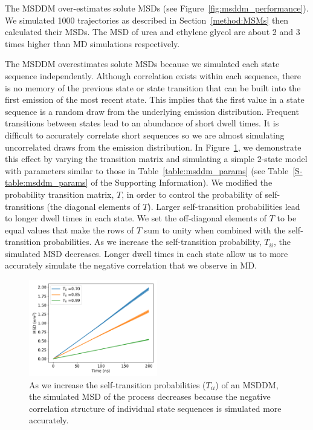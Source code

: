 \documentclass{article}
\begin{document}
  The MSDDM over-estimates solute MSDs (see Figure~\ref{fig:msddm_performance}). 
  We simulated 1000 trajectories as described in Section~\ref{method:MSMs} then
  calculated their MSDs. The MSD of urea and ethylene glycol are about 2 and 3 times
  higher than MD simulations respectively.
 
    The MSDDM overestimates solute MSDs because we simulated each state
  sequence independently. Although correlation exists within each
  sequence, there is no memory of the previous state or state transition 
  that can be built into the first emission of the most recent state. 
  This implies that the first value in a state sequence is a random
  draw from the underlying emission distribution. Frequent transitions
  between states lead to an abundance of short dwell times. It is 
  difficult to accurately correlate short sequences so we are 
  almost simulating uncorrelated draws from the emission distribution.
  In Figure~\ref{fig:T_sensitivity}, we demonstrate this effect by varying 
  the transition matrix and simulating a simple 2-state model with parameters
  similar to those in Table~\ref{table:msddm_params} (see Table~\ref{S-table:msddm_params}
  of the Supporting Information). We modified the probability
  transition matrix, $T$, in order to control the probability of 
  self-transitions (the diagonal elements of $T$). Larger self-transition probabilities lead to longer dwell 
  times in each state. We set the off-diagonal elements of $T$ to be equal values that make the
  rows of $T$ sum to unity when combined with the self-transition probabilities. 
  As we increase the self-transition probability, $T_{ii}$, the simulated MSD 
  decreases. Longer dwell times in each state allow us to more accurately
  simulate the negative correlation that we observe in MD.
  
  \begin{figure}
  \centering
  \includegraphics[width=0.5\textwidth]{T_sensitivity.pdf}
  \caption{As we increase the self-transition probabilities ($T_{ii}$) of an MSDDM,
  the simulated MSD of the process decreases because the negative correlation structure
  of individual state sequences is simulated more accurately.}\label{fig:T_sensitivity}
  \end{figure}
  
\end{document}
